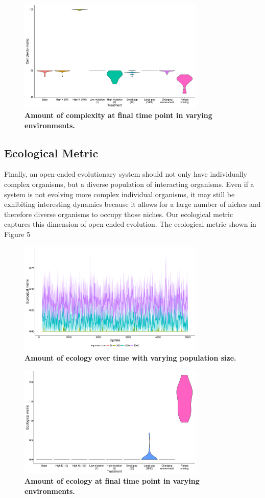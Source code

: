 \documentclass[letterpaper]{article}
\begin{document}
\begin{figure}
\includegraphics[width=3.5in]{figs/complexityboxplots.png}
\caption{\textbf{Amount of complexity at final time point in varying environments.} }
\label{complexity}
\end{figure}

\subsection{Ecological Metric}
Finally, an open-ended evolutionary system should not only have individually complex organisms, but a diverse population of interacting organisms. Even if a system is not evolving more complex individual organisms, it may still be exhibiting interesting dynamics because it allows for a large number of niches and therefore diverse organisms to occupy those niches. Our ecological metric captures this dimension of open-ended evolution. The ecological metric shown in Figure 5 

\begin{figure}
\includegraphics[width=3.5in]{figs/ecological_mean_ci_pop_size.png}
\caption{\textbf{Amount of ecology over time with varying population size.}}
\label{ecological_time}
\end{figure}
\begin{figure}
\includegraphics[width=3.5in]{figs/ecologyboxplots.png}
\caption{\textbf{Amount of ecology at final time point in varying environments.} }
\label{ecology}
\end{figure}
\end{document}
